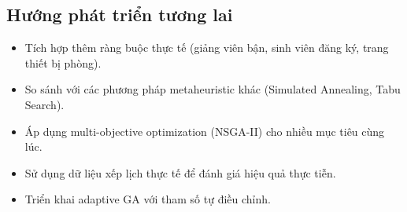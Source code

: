 \subsection{Hướng phát triển tương lai}
\begin{itemize}
    \item Tích hợp thêm ràng buộc thực tế (giảng viên bận, sinh viên đăng ký, trang thiết bị phòng).
    \item So sánh với các phương pháp metaheuristic khác (Simulated Annealing, Tabu Search).
    \item Áp dụng multi-objective optimization (NSGA-II) cho nhiều mục tiêu cùng lúc.
    \item Sử dụng dữ liệu xếp lịch thực tế để đánh giá hiệu quả thực tiễn.
    \item Triển khai adaptive GA với tham số tự điều chỉnh.
\end{itemize}
